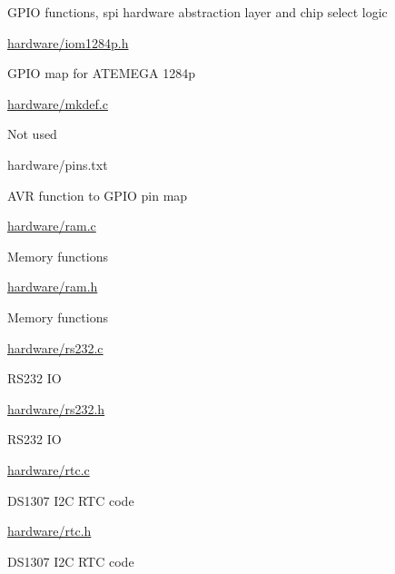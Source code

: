 {\begin{DoxyItemize}
\begin{DoxyItemize}
\begin{DoxyItemize}
\item G\+P\+IO functions, spi hardware abstraction layer and chip select logic
\end{DoxyItemize}
\item \hyperlink{iom1284p_8h}{hardware/iom1284p.\+h}
\begin{DoxyItemize}
\item G\+P\+IO map for A\+T\+E\+M\+E\+GA 1284p
\end{DoxyItemize}
\item \hyperlink{mkdef_8c}{hardware/mkdef.\+c}
\begin{DoxyItemize}
\item Not used
\end{DoxyItemize}
\item hardware/pins.\+txt
\begin{DoxyItemize}
\item A\+VR function to G\+P\+IO pin map
\end{DoxyItemize}
\item \hyperlink{ram_8c}{hardware/ram.\+c}
\begin{DoxyItemize}
\item Memory functions
\end{DoxyItemize}
\item \hyperlink{ram_8h}{hardware/ram.\+h}
\begin{DoxyItemize}
\item Memory functions
\end{DoxyItemize}
\item \hyperlink{rs232_8c}{hardware/rs232.\+c}
\begin{DoxyItemize}
\item R\+S232 IO
\end{DoxyItemize}
\item \hyperlink{rs232_8h}{hardware/rs232.\+h}
\begin{DoxyItemize}
\item R\+S232 IO
\end{DoxyItemize}
\item \hyperlink{rtc_8c}{hardware/rtc.\+c}
\begin{DoxyItemize}
\item D\+S1307 I2C R\+TC code
\end{DoxyItemize}
\item \hyperlink{rtc_8h}{hardware/rtc.\+h}
\begin{DoxyItemize}
\item D\+S1307 I2C R\+TC code
\end{DoxyItemize}

\end{DoxyItemize}
\end{DoxyItemize}}
